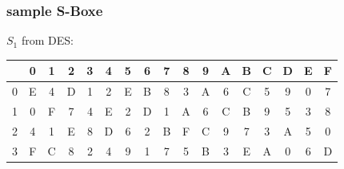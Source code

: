 \begin{frame}
\frametitle{sample S-Boxe}
 $S_1$ from DES:
 \begin{tabular}{c|*{16}{c}}
    &  0 &  1 &  2 &  3 &  4 &  5 &  6 &  7 &  8 &  9 &  A &  B &  C &  D &  E &  F \\ \hline
  0 &  E &  4 &  D &  1 &  2 &  E &  B &  8 &  3 &  A &  6 &  C &  5 &  9 &  0 &  7 \\
  1 &  0 &  F &  7 &  4 &  E &  2 &  D &  1 &  A &  6 &  C &  B &  9 &  5 &  3 &  8 \\
  2 &  4 &  1 &  E &  8 &  D &  6 &  2 &  B &  F &  C &  9 &  7 &  3 &  A &  5 &  0 \\
  3 &  F &  C &  8 &  2 &  4 &  9 &  1 &  7 &  5 &  B &  3 &  E &  A &  0 &  6 &  D \\
 \end{tabular}
\end{frame}








